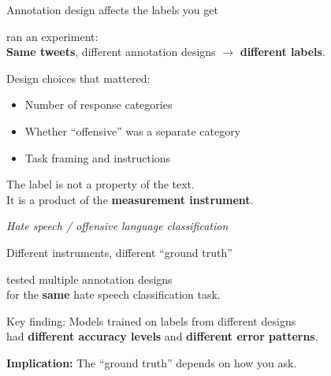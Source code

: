 \documentclass[aspectratio=169,11pt]{beamer}
\begin{document}
\begin{frame}{Annotation design affects the labels you get}

\citet{kern2023annotation} ran an experiment:\\[0.5em]

\textbf{Same tweets}, different annotation designs $\to$ \textbf{different labels}.

\vspace{1em}

Design choices that mattered:
\begin{itemize}
  \item Number of response categories
  \item Whether ``offensive'' was a separate category
  \item Task framing and instructions
\end{itemize}

\vspace{1em}

The label is not a property of the text.\\
It is a product of the \textbf{measurement instrument}.

\vspace{0.5em}
\hfill \small \textit{Hate speech / offensive language classification}
\end{frame}

\begin{frame}{Different instruments, different ``ground truth''}


\citet{kern2023annotation} tested multiple annotation designs\\
for the \textbf{same} hate speech classification task.

\vspace{1em}

Key finding: Models trained on labels from different designs\\
had \textbf{different accuracy levels} and \textbf{different error patterns}.

\vspace{1em}

\textbf{Implication:} The ``ground truth'' depends on how you ask.
\end{frame}
\end{document}
